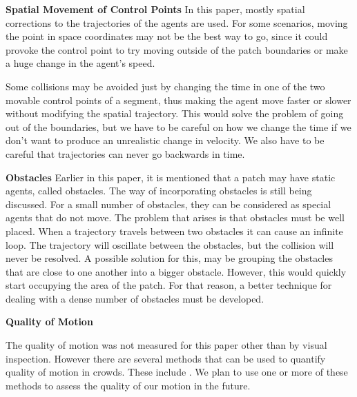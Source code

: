 \textbf{ Spatial Movement of Control Points}
In this paper, mostly spatial corrections to the trajectories of the agents are used. For some scenarios, moving the point in space coordinates may not be the best way to go, since it could provoke the control point to try moving outside of the patch boundaries or make a huge change in the agent's speed.   

Some collisions may be avoided just by changing the time in one of the two movable control points of a segment, thus making the agent move faster or slower without modifying the spatial trajectory. This would solve the problem of going out of the boundaries, but we have to be careful on how we change the time if we don't want to produce an unrealistic change in velocity.  We also have to be careful that trajectories can never go backwards in time. 


\textbf{Obstacles}
Earlier in this paper, it is mentioned that a patch may have static agents, called obstacles. The way of incorporating obstacles is still being discussed. For a small number of obstacles, they can be considered as special agents that do not move. The problem that arises is that obstacles must be well placed. When a trajectory travels between two obstacles it can cause an infinite loop. The trajectory will oscillate between the obstacles, but the collision will never be resolved. A possible solution for this, may be grouping the obstacles that are close to one another into a bigger obstacle. However, this would quickly start occupying the area of the patch. For that reason, a better technique for dealing with a dense number of obstacles must be developed. 

\textbf{Quality of Motion}

The quality of motion was not measured for this paper other than by visual inspection. However there are several methods that can be used to quantify quality of motion in crowds. These include \note{(=====================)}. We plan to use one or more of these methods to assess the quality of our motion in the future.